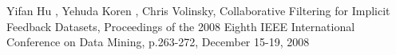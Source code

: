 \documentclass{article}
\begin{document}
\begin{thebibliography}{99} %
Yifan Hu , Yehuda Koren , Chris Volinsky, Collaborative Filtering for Implicit Feedback Datasets, Proceedings of the 2008 Eighth IEEE International Conference on Data Mining, p.263-272, December 15-19, 2008


\end{thebibliography}

\end{document}
